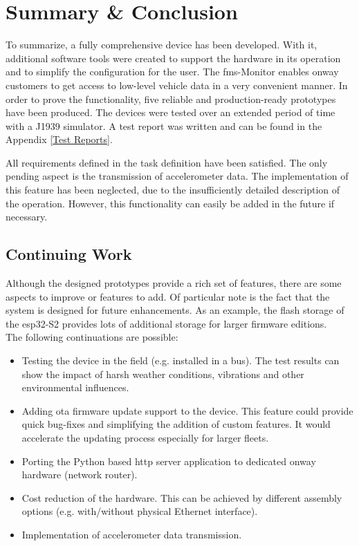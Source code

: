 \chapter{Summary \& Conclusion}
To summarize, a fully comprehensive device has been developed. With it, additional software tools were created to support the hardware in its operation and to simplify the configuration for the user. The \acrshort{fms}-Monitor enables onway customers to get access to low-level vehicle data in a very convenient manner. In order to prove the functionality, five reliable and production-ready prototypes have been produced. The devices were tested over an extended period of time with a J1939 simulator. A test report was written and can be found in the Appendix \ref{Test Reports}.

All requirements defined in the task definition have been satisfied. The only pending aspect is the transmission of accelerometer data. The implementation of this feature has been neglected, due to the insufficiently detailed description of the operation. However, this functionality can easily be added in the future if necessary.

\section{Continuing Work}
Although the designed prototypes provide a rich set of features, there are some aspects to improve or features to add.  Of particular note is the fact that the system is designed for future enhancements. As an example, the flash storage of the \gls{esp32}-S2 provides lots of additional storage for larger firmware editions.\\
The following continuations are possible:

\begin{itemize}
		\item Testing the device in the field (e.g. installed in a bus). The test results can show the impact of harsh weather conditions, vibrations and other environmental influences. 
		\item Adding \acrfull{ota} firmware update support to the device. This feature could provide quick bug-fixes and simplifying the addition of custom features. It would accelerate the updating process especially for larger fleets.
		\item Porting the Python based \acrshort{http} server application to dedicated onway hardware (network router).
		\item Cost reduction of the hardware. This can be achieved by different assembly options (e.g. with/without physical Ethernet interface).
		\item Implementation of accelerometer data transmission.
\end{itemize}

